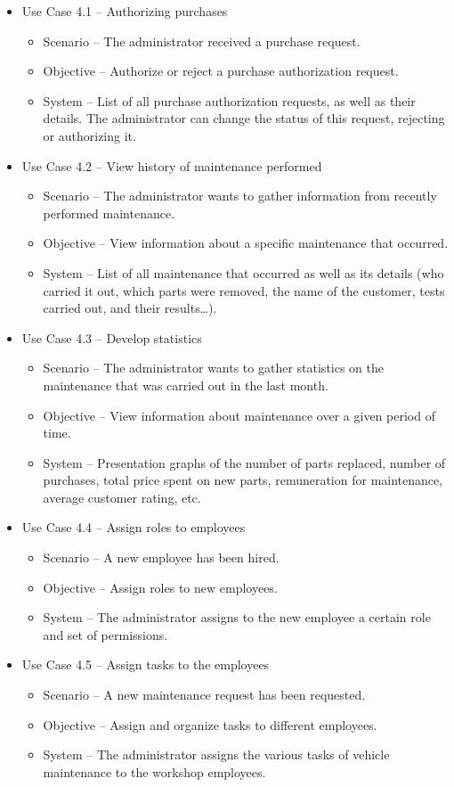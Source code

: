 \begin{itemize}
  \item Use Case 4.1 – Authorizing purchases
  \begin{itemize}
    \item Scenario –  The administrator received a purchase request.
    \item Objective – Authorize or reject a purchase authorization request.
    \item System – List of all purchase authorization requests, as well as their details. The administrator can change the status of this request, rejecting or authorizing it. 
  \end{itemize}
  \item Use Case 4.2 – View history of maintenance performed
  \begin{itemize}
    \item Scenario – The administrator wants to gather information from recently performed maintenance.
    \item Objective – View information about a specific maintenance that occurred.
    \item System – List of all maintenance that occurred as well as its details (who carried it out, which parts were removed, the name of the customer, tests carried out, and their results…). 
  \end{itemize}
  \item Use Case 4.3 – Develop statistics
  \begin{itemize}
    \item Scenario – The administrator wants to gather statistics on the maintenance that was carried out in the last month.
    \item Objective – View information about maintenance over a given period of time.
    \item System – Presentation graphs of the number of parts replaced, number of purchases, total price spent on new parts, remuneration for maintenance, average customer rating, etc.
  \end{itemize}
  \item Use Case 4.4 – Assign roles to employees
  \begin{itemize}
    \item Scenario – A new employee has been hired.
    \item Objective –  Assign roles to new employees.
    \item System – The administrator assigns to the new employee a certain role and set of permissions.
  \end{itemize}
  \item Use Case 4.5 – Assign tasks to the employees
  \begin{itemize}
    \item Scenario – A new maintenance request has been requested.
    \item Objective – Assign and organize tasks to different employees.
    \item System – The administrator assigns the various tasks of vehicle maintenance to the workshop employees.
  \end{itemize}
\end{itemize}
\hfill \break

